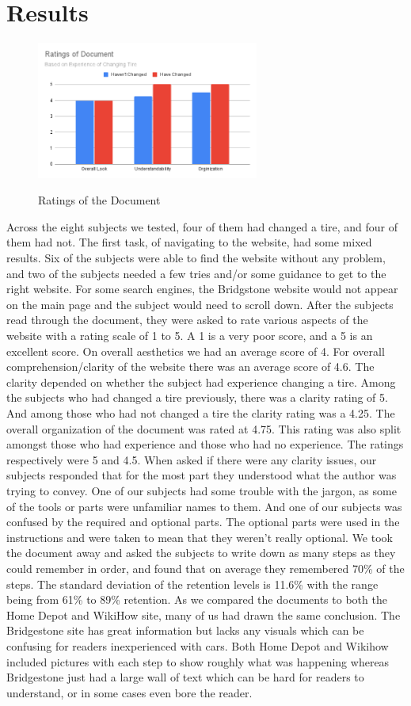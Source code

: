 \documentclass[12pt,A4paper]{article}
\begin{document}
	\section{Results}
	\begin{figure}[!h]
		\centering
		\includegraphics[width=0.65\textwidth]{Ratings_of_Document.png}
		\label{fig:f2}
		\caption{Ratings of the Document}
	\end{figure}
	Across the eight subjects we tested, four of them had changed a tire, and four of them had not. The first task, of navigating to the website, had some mixed results. Six of the subjects were able to find the website without any problem, and two of the subjects needed a few tries and/or some guidance to get to the right website. For some search engines, the Bridgstone website would not appear on the main page and the subject would need to scroll down. After the subjects read through the document, they were asked to rate various aspects of the website with a rating scale of 1 to 5. A 1 is a very poor score, and a 5 is an excellent score. On overall aesthetics we had an average score of 4. For overall comprehension/clarity of the website there was an average score of 4.6. The clarity depended on whether the subject had experience changing a tire. Among the subjects who had changed a tire previously, there was a clarity rating of 5. And among those who had not changed a tire the clarity rating was a 4.25. The overall organization of the document was rated at 4.75. This rating was also split amongst those who had experience and those who had no experience. The ratings respectively were 5 and 4.5. When asked if there were any clarity issues, our subjects responded that for the most part they understood what the author was trying to convey. One of our subjects had some trouble with the jargon, as some of the tools or parts were unfamiliar names to them. And one of our subjects was confused by the required and optional parts. The optional parts were used in the instructions and were taken to mean that they weren’t really optional. We took the document away and asked the subjects to write down as many steps as they could remember in order, and found that on average they remembered 70\% of the steps. The standard deviation of the retention levels is 11.6\% with the range being from 61\% to 89\% retention. As we compared the documents to both the Home Depot and WikiHow site, many of us had drawn the same conclusion. The Bridgestone site has great information but lacks any visuals which can be confusing for readers inexperienced with cars. Both Home Depot and Wikihow included pictures with each step to show roughly what was happening whereas Bridgestone just had a large wall of text which can be hard for readers to understand, or in some cases even bore the reader.
\end{document}
